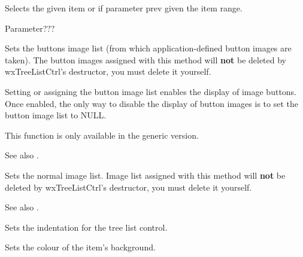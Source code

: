 \label{wxtreelistctrlselectitem}


Selects the given item or if parameter prev given the item range.

Parameter???

\label{wxtreelistctrlsetbuttonsimagelist}


Sets the buttons image list (from which application-defined button images are taken).
The button images assigned with this method will
{\bf not} be deleted by wxTreeListCtrl's destructor, you must delete it yourself.

Setting or assigning the button image list enables the display of image buttons.
Once enabled, the only way to disable the display of button images is to set
the button image list to NULL.

This function is only available in the generic version.

See also .

\label{wxtreelistctrlsetimagelist}


Sets the normal image list. Image list assigned with this method will
{\bf not} be deleted by wxTreeListCtrl's destructor, you must delete it yourself.

See also .

\label{wxtreelistctrlsetindent}


Sets the indentation for the tree list control.

\label{wxtreelistctrlsetitembackgroundcolour}


Sets the colour of the item's background.


